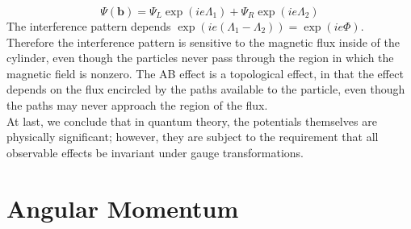 \[\Psi(\bm{b}) = \Psi_L\exp(ie\Lambda_1) + \Psi_R\exp(ie\Lambda_2)\]
The interference pattern depends $\exp(ie(\Lambda_1-\Lambda_2)) = \exp(ie\Phi)$. 
Therefore the interference pattern is sensitive to the magnetic flux inside of the cylinder, even though the particles never pass through the region in which the magnetic field is nonzero. 
The AB effect is a topological effect, in that the effect depends on the flux encircled by the paths available to the particle, even though the paths may never approach the region of the flux. \\
At last, we conclude that in quantum theory, the potentials themselves are physically significant; however, they are subject to the requirement that all observable effects be invariant under gauge transformations.

\chapter{Angular Momentum}
